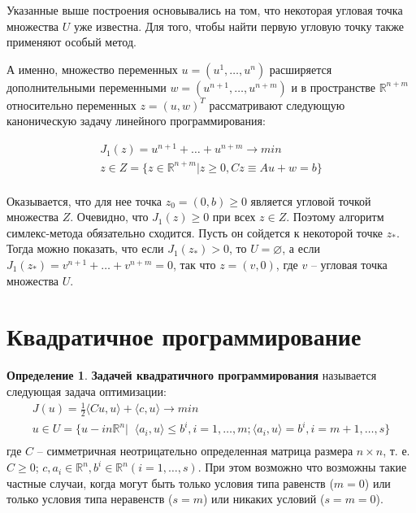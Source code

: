 \documentclass[a4paper, 12pt, titlepage]{article}
\theoremstyle{definition}
\newtheorem{SmartDefinition}{Определение}
\theoremstyle{plain}
\theoremstyle{plain}
\begin{document}
Указанные выше построения основывались на том, что некоторая угловая точка
множества $U$ уже известна. Для того, чтобы найти первую угловую точку также
применяют особый метод.

А именно, множество переменных $u = (u^{1}, \ldots, u^{n})$ расширяется
дополнительными переменными $w = (u^{n + 1}, \ldots, u^{n + m})$ и в
пространстве $\mathbb{R}^{n + m}$ относительно переменных
$z = (u, w)^{T}$ рассматривают следующую каноническую задачу линейного
программирования:

\begin{equation}
\begin{aligned}
 J_{1}(z) = u^{n + 1} + \ldots + u^{n + m} \to min \\
 z \in Z = \{ z \in \mathbb{R}^{n + m} | z \geq 0,
 C z \equiv A u + w = b \} \\
\end{aligned}
\end{equation}

Оказывается, что для нее точка $z_{0} = (0, b) \geq 0$ является угловой точкой
множества $Z$. Очевидно, что $J_{1}(z) \geq 0$ при всех $z \in Z$. Поэтому
алгоритм симлекс-метода обязательно сходится. Пусть он сойдется к некоторой
точке $z_{*}$. Тогда можно показать, что если $J_{1}(z_{*}) > 0$, то
$U = \varnothing$, а если $J_{1}(z_{*}) = v^{n + 1} + \ldots + v^{n + m} = 0$, 
так что $z = (v, 0)$, где $v$ -- угловая точка множества $U$.

\section{Квадратичное программирование}

\begin{SmartDefinition}
 \textbf{Задачей квадратичного программирования} называется следующая задача
 оптимизации:
 \begin{equation}
  \begin{aligned}
  \label{eq:qp}
  J(u) = \frac{1}{2} \langle C u, u \rangle + \langle c, u \rangle \to min \\
  u \in U = \{u -in \mathbb{R}^{n} | \;\; \langle a_{i}, u \rangle \leq b^{i},
  i = 1, \ldots, m; \langle a_{i}, u \rangle = b^{i}, i = m + 1, \ldots, s\} \\
  \end{aligned}
 \end{equation}
 где $C$ -- симметричная неотрицательно определенная матрица размера
 $n \times n$, т. е.
 $C \geq 0$; $c, a_{i} \in \mathbb{R}^{n}, b^{i} \in \mathbb{R}^{n} (i = 1, 
 \ldots, s)$. При этом возможно что возможны такие частные случаи, когда могут
 быть только условия типа равенств ($m = 0$) или только условия типа неравенств
 ($s = m$) или никаких условий ($s = m = 0$).
\end{SmartDefinition}
\end{document}
